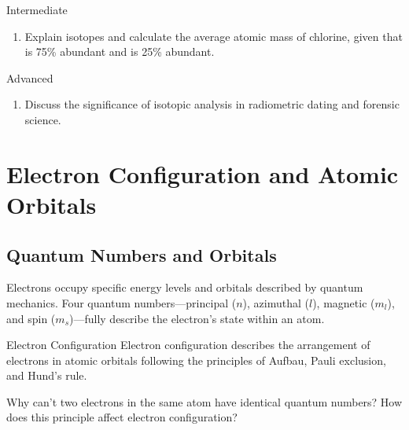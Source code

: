 \begin{tieredquestions}{Intermediate}
\begin{enumerate}
    \item Explain isotopes and calculate the average atomic mass of chlorine, given that  is 75\% abundant and  is 25\% abundant.
\end{enumerate}
\end{tieredquestions}

\begin{tieredquestions}{Advanced}
\begin{enumerate}
    \item Discuss the significance of isotopic analysis in radiometric dating and forensic science.
\end{enumerate}
\end{tieredquestions}

\FloatBarrier

\section{Electron Configuration and Atomic Orbitals}
\FloatBarrier
\FloatBarrier
\FloatBarrier

\subsection{Quantum Numbers and Orbitals}
\FloatBarrier
\FloatBarrier
\FloatBarrier

Electrons occupy specific energy levels and orbitals described by quantum mechanics. Four quantum numbers—principal ($n$), azimuthal ($l$), magnetic ($m_l$), and spin ($m_s$)—fully describe the electron's state within an atom.


\begin{keyconcept}{Electron Configuration}
Electron configuration describes the arrangement of electrons in atomic orbitals following the principles of Aufbau, Pauli exclusion, and Hund's rule.
\end{keyconcept}

\begin{stopandthink}
Why can't two electrons in the same atom have identical quantum numbers? How does this principle affect electron configuration?
\end{stopandthink}

